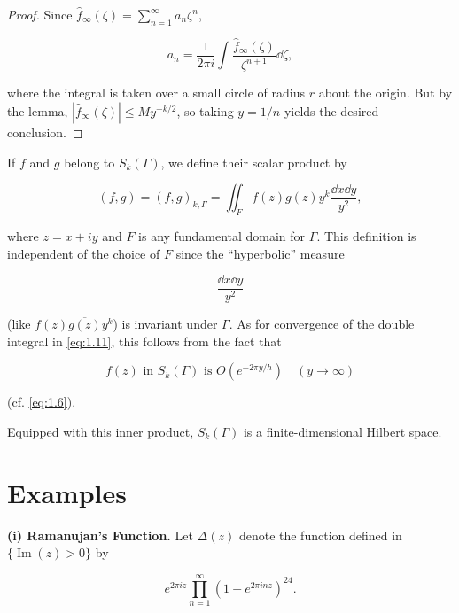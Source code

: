 \begin{proof}

Since $\hat{f}_{\infty}(\zeta) = \sum_{n=1}^{\infty} a_n \zeta^n$,

\[
a_n = \frac{1}{2\pi i} \int \frac{\hat{f}_{\infty}(\zeta)}{\zeta^{n+1}} \dd\zeta,
\]

where the integral is taken over a small circle of radius $r$ about the origin. But by the lemma, $|\hat{f}_{\infty}(\zeta)| \leq My^{-k/2}$, so taking $y = 1/n$ yields the desired conclusion.

\end{proof}

\begin{remark}\label{rem:1.7}

If $f$ and $g$ belong to $S_k(\Gamma)$, we define their scalar product by

\begin{equation}\label{eq:1.11}
(f, g) = (f, g)_{k,\Gamma} = \iint_F f(z)\overline{g(z)} y^k \frac{\dd x \dd y}{y^2},\tag{1.11}
\end{equation}

where $z = x + iy$ and $F$ is any fundamental domain for $\Gamma$. This definition is independent of the choice of $F$ since the ``hyperbolic'' measure

\[
\frac{\dd x \dd y}{y^2}
\]

(like $f(z)\overline{g(z)} y^k$) is invariant under $\Gamma$. As for convergence of the double integral in \eqref{eq:1.11}, this follows from the fact that

\begin{equation}\label{eq:1.12}
f(z) \text{ in } S_k(\Gamma) \text{ is } O(e^{-2\pi y/h}) \quad (y \to \infty)\tag{1.12}
\end{equation}

(cf. \eqref{eq:1.6}).

\end{remark}

Equipped with this inner product, $S_k(\Gamma)$ is a finite-dimensional Hilbert space.

\section{Examples}\label{sec:1b}

\textbf{(i) Ramanujan's Function.} Let $\Delta(z)$ denote the function defined in $\{\operatorname{Im}(z) > 0\}$ by

\[
e^{2\pi iz} \prod_{n=1}^{\infty} (1 - e^{2\pi inz})^{24}.
\]

